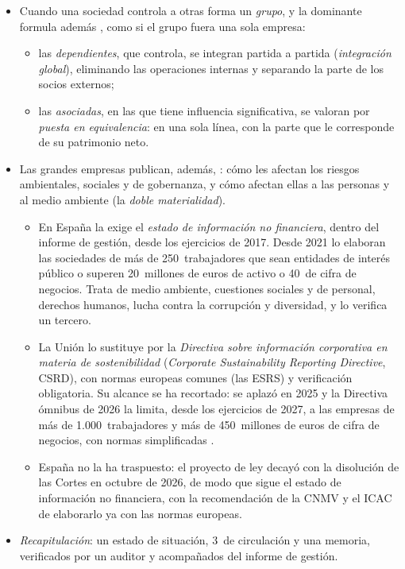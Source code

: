 \documentclass[11pt]{article}
\begin{document}
\begin{itemize}
\begin{itemize}
  \end{itemize}
\item Cuando una sociedad controla a otras forma un \emph{grupo}, y la dominante formula además , como si el grupo fuera una sola empresa\nocite{BOE2010NOFCAC}:
  \begin{itemize}
  \item las \emph{dependientes}, que controla, se integran partida a partida (\emph{integración global}), eliminando las operaciones internas y separando la parte de los socios externos;
  \item las \emph{asociadas}, en las que tiene influencia significativa, se valoran por \emph{puesta en equivalencia}: en una sola línea, con la parte que le corresponde de su patrimonio neto.
  \end{itemize}
\item Las grandes empresas publican, además, : cómo les afectan los riesgos ambientales, sociales y de gobernanza, y cómo afectan ellas a las personas y al medio ambiente (la \emph{doble materialidad}).
  \begin{itemize}
  \item En España la exige el \emph{estado de información no financiera}, dentro del informe de gestión, desde los ejercicios de 2017. Desde 2021 lo elaboran las sociedades de más de 250~trabajadores que sean entidades de interés público o superen 20~millones de euros de activo o 40~de cifra de negocios. Trata de medio ambiente, cuestiones sociales y de personal, derechos humanos, lucha contra la corrupción y diversidad, y lo verifica un tercero\nocite{BOE2018Ley11,LSC2010}.
  \item La Unión lo sustituye por la \emph{Directiva sobre información corporativa en materia de sostenibilidad} (\emph{Corporate Sustainability Reporting Directive}, CSRD), con normas europeas comunes (las ESRS) y verificación obligatoria\nocite{UE2022CSRD,UE2023ESRS}. Su alcance se ha recortado: se aplazó en 2025 y la Directiva ómnibus de 2026 la limita, desde los ejercicios de 2027, a las empresas de más de 1.000~trabajadores y más de 450~millones de euros de cifra de negocios, con normas simplificadas \nocite{UE2025StopClock,UE2026Omnibus,UE2026ESRSSet2}.
  \item España no la ha traspuesto: el proyecto de ley decayó con la disolución de las Cortes en octubre de 2026, de modo que sigue el estado de información no financiera, con la recomendación de la CNMV y el ICAC de elaborarlo ya con las normas europeas\nocite{Congreso2026Sostenibilidad,BOE2026RD806,CNMVICAC2026Sostenibilidad}.
  \end{itemize}
\item \emph{Recapitulación}: un estado de situación, 3~de circulación y una memoria, verificados por un auditor y acompañados del informe de gestión.
\end{itemize}
\end{document}
